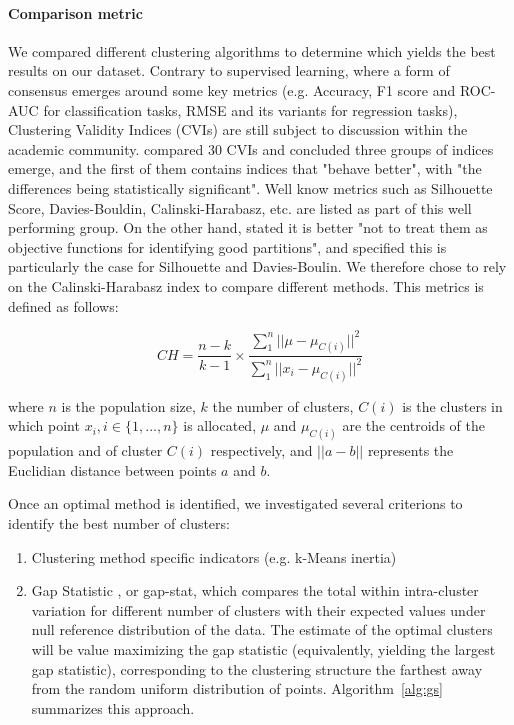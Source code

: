 \paragraph{Comparison metric}
We compared different clustering algorithms to determine which yields the best results on our dataset.
Contrary to supervised learning, where a form of consensus emerges around some key metrics (e.g. Accuracy, F1 score and ROC-AUC for classification tasks, RMSE and its variants for regression tasks), Clustering Validity Indices (CVIs) are still subject to discussion within the academic community. 
\cite{Arbelaitz2013AnEC} compared 30 CVIs and concluded three groups of indices emerge, and the first of them contains indices that "behave better", with "the differences being statistically significant". 
Well know metrics such as Silhouette Score, Davies-Bouldin, Calinski-Harabasz, etc. are listed as part of this well performing group.
On the other hand, \cite{Gagolewski_2021} stated it is better "not to treat them as objective functions for identifying good partitions", and specified this is particularly the case for Silhouette and Davies-Boulin. 
We therefore chose to rely on the Calinski-Harabasz index to compare different methods.
This metrics is defined as follows:

\begin{equation}
CH = \frac{n-k}{k-1} \times \frac{ \sum_{1}^{n}{||\mu - \mu_{C(i)}||^{2}}}{ \sum_{1}^{n}{||x_i - \mu_{C(i)}||^{2}} } 
\end{equation}

where $n$ is the population size, $k$ the number of clusters, $C(i)$ is the clusters in which point $x_i, i \in \{1, ..., n\}$ is allocated, $\mu$ and $\mu_{C(i)}$ are the centroids of the population and of cluster $C(i)$ respectively, and $|| a - b ||$ represents the Euclidian distance between points $a$ and $b$. 
 
Once an optimal method is identified, we investigated several criterions to identify the best number of clusters:
\begin{enumerate}[i]
  \item Clustering method specific indicators (e.g. k-Means inertia)
  \item Gap Statistic \citep{Tibshirani2001EstimatingTN}, or gap-stat, which compares the total within intra-cluster variation for different number of clusters with their expected values under null reference distribution of the data. 
  The estimate of the optimal clusters will be value maximizing the gap statistic (equivalently, yielding the largest gap statistic), corresponding to the clustering structure the farthest away from the random uniform distribution of points.
  Algorithm~\ref{alg:gs} summarizes this approach.
\end{enumerate}


